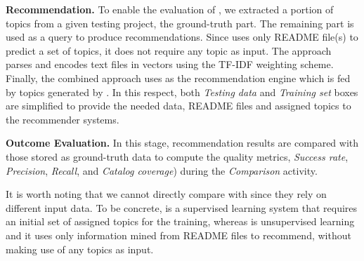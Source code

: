 \vspace{.1cm}
\noindent\textbf{Recommendation.} To enable the evaluation of \TF, we extracted a portion of topics from a given testing project, \ie the ground-truth part. The remaining part is used as a query to produce recommendations. %
Since \MNB uses only README file(s) to predict a set of topics, it does not require any topic as input. The approach parses and encodes text files in vectors using the TF-IDF weighting scheme. 
Finally, the combined approach uses \TF as the recommendation engine which is fed by topics generated by \MNB. In this respect, both \textit{Testing data} and \textit{Training set} boxes are simplified to provide the needed data, \ie README files and assigned topics to the recommender systems.

\vspace{.1cm}
\noindent\textbf{Outcome Evaluation.} In this stage, recommendation results are compared with those stored as ground-truth data to compute the quality metrics, \ie \textit{Success rate}, \textit{Precision}, \textit{Recall}, and \textit{Catalog coverage}) during the \textit{Comparison} activity.  

It is worth noting that we cannot directly compare \TF with \MNB since they rely on different input data. To be concrete, \TF is a supervised learning system that requires an initial set of assigned topics for the training, whereas \MNB is unsupervised learning and it uses only information mined from README files to recommend, without making use of any topics as input. 







